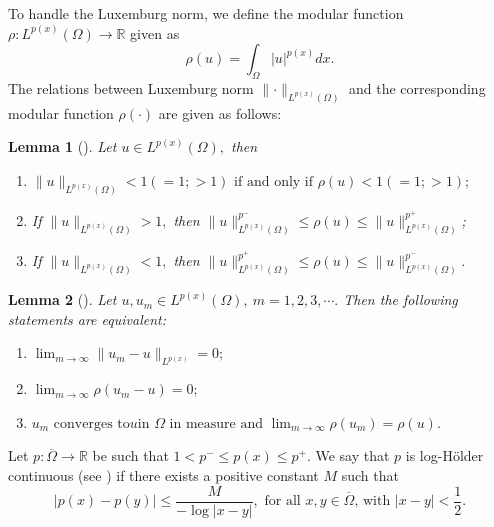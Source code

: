 \documentclass[11pt]{article}
\newtheorem{lemma}{Lemma}[section] %
\newcommand{\R}{\mathbb{R}}
\newcommand{\om} {\Omega}
\newcommand{\oline} {\overline}
\newcommand{\ra} {\rightarrow}
\newcommand{\real}{\mathbb{R}}
\newcommand{\lv}{\lVert}
\newcommand{\rv}{\rVert}
\begin{document}
To handle the Luxemburg norm, 
we define the modular function
$\rho:L^{p(x)}(\Omega)\ra \real$
given as
$$
\rho(u) = 
\int_\Omega |u|^{p(x)}dx.
$$
The relations between Luxemburg norm
$\lv \cdot \rv_{L^{p(x)}(\Omega)}$
and 
the corresponding modular function
$\rho(\cdot)$
are given as follows:


\begin{lemma}[\cite{fan_lp_wp_spaces}]
\label{modular_ineq}
	Let
$u \in L^{p(x)}(\Omega),$
then 
	\begin{enumerate}
		
\item[$(i)$]$
\lv u \rv_{L^{p(x)}(\Omega)}<1(=1;>1) 
\text{ if and only if } \rho(u)<1(=1;>1);$
		
\item[$(ii)$] If
$\lv u \rv_{L^{p(x)}(\Omega)}>1,$
then
$\lv u \rv_{L^{p(x)}(\Omega)} ^{p^{-}}
\leq\rho(u)\leq\lv u \rv_{L^{p(x)}(\Omega)}^{p^{+}}$;

		
\item[$(iii)$] If
$\lv u \rv_{L^{p(x)}(\Omega)}<1,$
then
$\lv u \rv_{L^{p(x)}(\Omega)}^{p^{+}}
\leq\rho(u)\leq\lv u \rv_{L^{p(x)}(\Omega)}^{p^{-}}.$
	\end{enumerate}
\end{lemma}

\begin{lemma}[\cite{fan_lp_wp_spaces}]
\label{lem:modular_cgs_lp}
	Let
$u,u_{m}  \in L^{{p(x)}}(\Omega),~m=1,2,3,\cdots .$
Then the following statements are equivalent:
	\begin{enumerate}
		
\item[$(i)$]
$\displaystyle{\lim_{m\ra \infty} }\lv 
u_{m} - u \rv_{L^{p(x)}} =0;$
		
\item[$(ii)$]
$\displaystyle{\lim_{m\ra \infty}} 
\rho(u_{m} -u)=0;$
		
\item[$(iii)$]
$
u_{m} \text{ converges to
$u$
in }  \Omega  \text { in measure and } 
\displaystyle{\lim_{m\ra \infty}} \rho(u_{m})
= \rho(u).$
	\end{enumerate}
\end{lemma}

Let
$p:\oline\om\to \R$
be such that
$1< p^-\le p(x)\le p^+.$
We say that
$p$
is log-H\"older continuous 
(see \cite{fan_lp_wp_spaces}) 
if there exists a positive constant
$M$
such that
$$
|p(x)-p(y)|\le
\frac{M}{-\log|x-y|}, 
\text{ for all }x,y\in\oline\om,\,\text{with } |x-y|<
\frac{1}{2}.
$$
\end{document}
